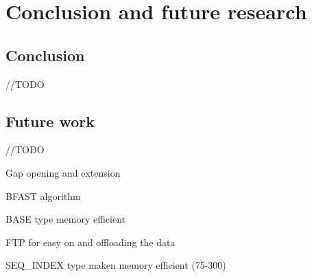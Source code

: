 
\chapter{Conclusion and future research}
\label{ch:Conclusions}

\section{Conclusion}

//TODO

\section{Future work}

//TODO

Gap opening and extension

BFAST algorithm

BASE type memory efficient

FTP for easy on and offloading the data

SEQ\_INDEX type maken memory efficient (75-300)